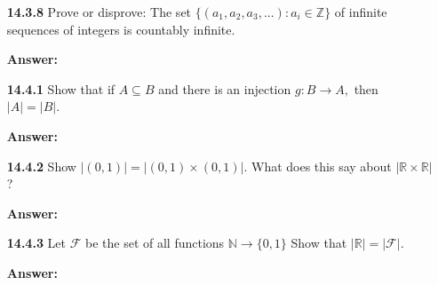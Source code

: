 \documentclass[11pt]{report}
\theoremstyle{plain}
\newcommand{\Z}{\mathbb{Z}}
\newcommand{\R}{\mathbb{R}}
\newcommand{\N}{\mathbb{N}}
\begin{document}
\begin{enumerate}
\vspace{1in}

\item[\textbf{14.3.8}] Prove or disprove: The set $\{(a_1,a_2,a_3,...) : a_i \in \Z\}$ of infinite sequences of integers is countably infinite.

\textbf{Answer:} \\

\vspace{1in}

\item[\textbf{14.4.1}] Show that if $A \subseteq B$ and there is an injection $g : B \to A,$ then $|A| = |B|.$

\textbf{Answer:} \\

\vspace{1in}

\item[\textbf{14.4.2}] Show $|(0,1)| = |(0,1) \times (0,1)|.$ What does this say about $|\R \times \R|$?

\textbf{Answer:} \\

\vspace{1in}

\item[\textbf{14.4.3}] Let $\mathcal{F}$ be the set of all functions $\N \to \{0,1\}$  Show that $|\R| = |\mathcal{F}|.$

\textbf{Answer:} \\

\vspace{1in}

\end{enumerate}
\end{document}
